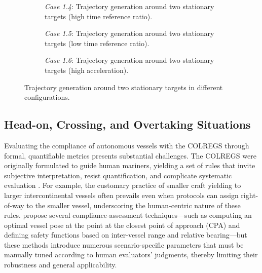 \begin{figure}
    \centering
    \begin{subfigure}[b]{\textwidth}
        \centering
        
        \caption{\emph{Case 1.4}: Trajectory generation around two stationary targets (high time reference ratio).}
        \label{fig:stationary-target-5}
    \end{subfigure}
    \hfill
    \begin{subfigure}[b]{\textwidth}
        \centering
        
        \caption{\emph{Case 1.5}: Trajectory generation around two stationary targets (low time reference ratio).}
        \label{fig:stationary-target-6}
    \end{subfigure}
    \hfill
    \begin{subfigure}[b]{\textwidth}
        \centering
        
        \caption{\emph{Case 1.6}: Trajectory generation around two stationary targets (high acceleration).}
        \label{fig:stationary-target-7}
    \end{subfigure}
    \caption{Trajectory generation around two stationary targets in different configurations.}
    \label{fig:stationary-targets-subfigures-2}
\end{figure}


\FloatBarrier
\subsection{Head-on, Crossing, and Overtaking Situations}
\label{sec:case-2-head-on}


Evaluating the compliance of autonomous vessels with the COLREGS through formal, quantifiable metrics presents substantial challenges. The COLREGS were originally formulated to guide human mariners, yielding a set of rules that invite subjective interpretation, resist quantification, and complicate systematic evaluation \citep{Woerner2018}.  For example, the customary practice of smaller craft yielding to larger intercontinental vessels often prevails even when protocols can assign right-of-way to the smaller vessel, underscoring the human-centric nature of these rules. \citet{Woerner2018} propose several compliance‐assessment techniques---such as computing an optimal vessel pose at the point at the closest point of approach (\acrshort{CPA}) and defining safety functions based on inter-vessel range and relative bearing---but these methods introduce numerous scenario-specific parameters that must be manually tuned according to human evaluators' judgments, thereby limiting their robustness and general applicability.


